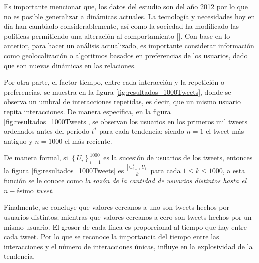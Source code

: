 \documentclass[../main.tex]{subfiles}
\begin{document}
\onehalfspacing

Es importante mencionar que, los datos del estudio son del año 2012 por lo que no es posible generalizar a dinámicas actuales. La tecnología y necesidades hoy en día han cambiado considerablemente, así como la sociedad ha modificado las políticas permitiendo una alteración al comportamiento [\cite{twitterEnglishUS}]. Con base en lo anterior, para hacer un análisis actualizado, es importante considerar información como  geolocalización o algoritmos basados en preferencias de los usuarios, dado que son nuevas dinámicas en las relaciones.







Por otra parte, el factor tiempo, entre cada interacción y la repetición o preferencias, se muestra en la figura \ref{fig:resultados_1000Tweets}, donde se observa un umbral de interacciones repetidas, es decir, que un mismo usuario repita interacciones. De manera específica, en la figura \ref{fig:resultados_1000Tweets}, se observan los usuarios en los primeros mil tweets ordenados antes del periodo $t^{*}$ para cada tendencia; siendo $n =1$ el tweet más antiguo y $n=1000$ el más reciente. 

De manera formal, si $\left\{ U_{i} \right\}_{i=1}^{1000}$ es la sucesión de usuarios de los tweets, entonces la figura \ref{fig:resultados_1000Tweets}  es $\frac{|\cup_{i=1}^{k} U_{i} |}{k}$ para cada $1 \leq k \leq 1000$, a esta función se le conoce como \textit{la razón de la cantidad de usuarios distintos hasta el $n-\text{ésimo}$ tweet.}


 Finalmente, se concluye que valores cercanos a uno son tweets  hechos por usuarios distintos; mientras que valores cercanos a cero son tweets hechos por un mismo usuario. El grosor de cada línea es proporcional al tiempo que hay entre cada tweet. Por lo que se  reconoce la importancia del tiempo entre las interacciones y el número de interacciones únicas, influye en la explosividad de la tendencia. 
 
\end{document}
